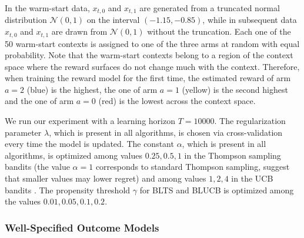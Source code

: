 \documentclass[letterpaper]{article} %
\begin{document}
In the warm-start data, $x_{t,0}$ and $x_{t,1}$ are generated from a truncated normal distribution $\mathcal{N}(0, 1)$ on the interval $(-1.15, -0.85)$, while in subsequent data $x_{t,0}$ and $x_{t,1}$ are drawn from $\mathcal{N}(0, 1)$ without the truncation.
Each one of the 50 warm-start contexts is assigned to one of the three arms at random with equal probability.
Note that the warm-start contexts belong to a region of the context space where the reward surfaces do not change much with the context.
Therefore, when training the reward model for the first time, the estimated reward of arm $a = 2$ (blue) is the highest, the one of arm $a = 1$ (yellow) is the second highest and the one of arm $a = 0$ (red) is the lowest across the context space.

We run our experiment with a learning horizon $T = 10000$. The regularization parameter $\lambda$, which is present in all algorithms, is chosen via cross-validation every time the model is updated. The constant $\alpha$, which is present in all algorithms, is optimized among values $0.25, 0.5, 1$ in the Thompson sampling bandits (the value $\alpha=1$ corresponds to standard Thompson sampling, \cite{chapelle-tsucb} suggest that smaller values may lower regret) and among values $1, 2, 4$ in the UCB bandits \cite{chapelle-tsucb}. The propensity threshold $\gamma$ for BLTS and BLUCB is optimized among the values $0.01, 0.05, 0.1, 0.2$.


\subsubsection{Well-Specified Outcome Models}\label{well}
\end{document}

